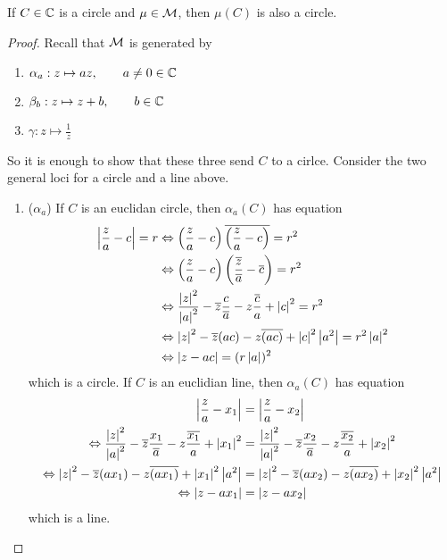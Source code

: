 \documentclass{article}
\begin{document}
\begin{thm}
    If $C \in \mathbb{C}$ is a circle and $\mu \in \mathcal{M}$, then $\mu(C)$ is also a circle.
\end{thm}
\begin{proof}
    Recall that $\mathcal{M}$ is generated by 
    \begin{enumerate}
        \item $\alpha_a: z \mapsto az, \qquad a \neq 0 \in \mathbb{C}$
        \item $\beta_b: z \mapsto z + b, \qquad b \in \mathbb{C}$
        \item $\gamma: z \mapsto \frac{1}{z}$
    \end{enumerate}
    So it is enough to show that these three send $C$ to a cirlce. Consider the two general loci for a circle and a line above.
    \begin{enumerate}[cases]
        \item ($\alpha_a$) If $C$ is an euclidan circle, then $\alpha_a(C)$ has equation
        \begin{align*}
            \left\lvert \frac{z}{a} - c\right\rvert = r &\Leftrightarrow \left( \frac{z}{a} - c \right)\overline{\left( \frac{z}{a} - c \right)} = r^2 \\
            &\Leftrightarrow \left( \frac{z}{a} - c \right)\left( \frac{\overline{z}}{\overline{a}} - \overline{c} \right) = r^2 \\
            &\Leftrightarrow \frac{\left\lvert z\right\rvert^2}{\left\lvert a\right\rvert^2} - \overline{z}\frac{c}{\overline{a}} - z\frac{\overline{c}}{a} + \left\lvert c\right\rvert^2 = r^2 \\
            &\Leftrightarrow \left\lvert z\right\rvert^2 - \overline{z} (ac) - z \overline{(ac)} + \left\lvert c\right\rvert^2\left\lvert a^2\right\rvert = r^2\left\lvert a\right\rvert^2 \\
            &\Leftrightarrow \left\lvert z - ac\right\rvert = (r\left\lvert a\right\rvert)^2
        \end{align*}
        which is a circle. If $C$ is an euclidian line, then $\alpha_a(C)$ has equation
        \begin{align*}
            \left\lvert \frac{z}{a} - x_1\right\rvert &= \left\lvert \frac{z}{a} - x_2\right\rvert \\
            \Leftrightarrow \frac{\left\lvert z\right\rvert^2}{\left\lvert a\right\rvert^2} - \overline{z}\frac{x_1}{\overline{a}} - z\frac{\overline{x_1}}{a} + \left\lvert x_1\right\rvert^2 &= \frac{\left\lvert z\right\rvert^2}{\left\lvert a\right\rvert^2} - \overline{z}\frac{x_2}{\overline{a}} - z\frac{\overline{x_2}}{a} + \left\lvert x_2\right\rvert^2 \\
            \Leftrightarrow \left\lvert z\right\rvert^2 - \overline{z} (ax_1) - z \overline{(ax_1)} + \left\lvert x_1\right\rvert^2\left\lvert a^2\right\rvert &= \left\lvert z\right\rvert^2 - \overline{z} (ax_2) - z \overline{(ax_2)} + \left\lvert x_2\right\rvert^2\left\lvert a^2\right\rvert \\
            \Leftrightarrow \left\lvert z - ax_1\right\rvert &= \left\lvert z - ax_2\right\rvert \\
        \end{align*}
        which is a line.
        

\end{enumerate}
\end{proof}
\end{document}
